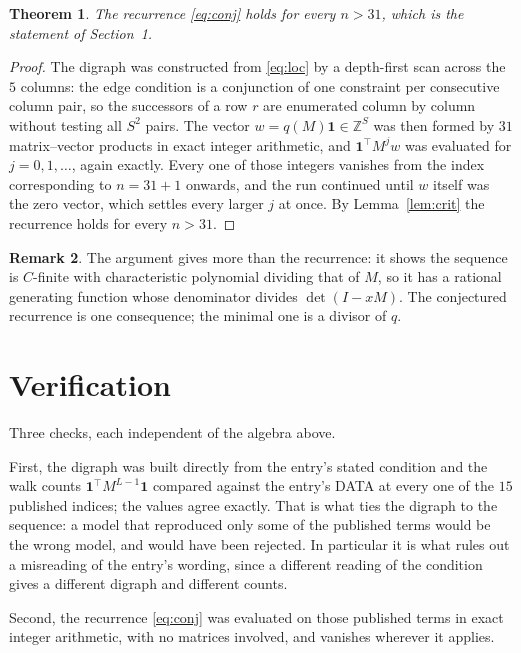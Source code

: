 \documentclass[11pt,a4paper]{article}
\theoremstyle{plain}
\newtheorem{theorem}{Theorem}
\theoremstyle{definition}
\newtheorem{remark}[theorem]{Remark}
\begin{document}
\begin{theorem}
The recurrence \eqref{eq:conj} holds for every $n>31$, which is the statement of
Section~1.
\end{theorem}

\begin{proof}
The digraph was constructed from \eqref{eq:loc} by a depth-first scan across the $5$
columns: the edge condition is a conjunction of one constraint per consecutive column
pair, so the successors of a row $r$ are enumerated column by column without testing all
$S^2$ pairs. The vector $w=q(M)\mathbf{1}\in\mathbb{Z}^{S}$ was then formed by $31$
matrix--vector products in exact integer arithmetic, and $\mathbf{1}^{\!\top}M^{j}w$ was
evaluated for $j=0,1,\dots$, again exactly. Every one of those integers vanishes from the
index corresponding to $n=31+1$ onwards, and the run continued until $w$ itself was the
zero vector, which settles every larger $j$ at once. By Lemma~\ref{lem:crit} the recurrence
holds for every $n>31$.
\end{proof}

\begin{remark}
The argument gives more than the recurrence: it shows the sequence is $C$-finite with
characteristic polynomial dividing that of $M$, so it has a rational generating function
whose denominator divides $\det(I-xM)$. The conjectured recurrence is one consequence; the
minimal one is a divisor of $q$.
\end{remark}

\section{Verification}

Three checks, each independent of the algebra above.

First, the digraph was built directly from the entry's stated condition and the walk counts
$\mathbf{1}^{\!\top}M^{L-1}\mathbf{1}$ compared against the entry's DATA at
every one of the $15$ published indices; the values agree exactly. That is what ties
the digraph to the sequence: a model that reproduced only some of the published terms would
be the wrong model, and would have been rejected. In particular it is what rules out a
misreading of the entry's wording, since a different reading of the condition gives a
different digraph and different counts.

Second, the recurrence \eqref{eq:conj} was evaluated on those published terms in exact
integer arithmetic, with no matrices involved, and vanishes wherever it applies.
\end{document}
